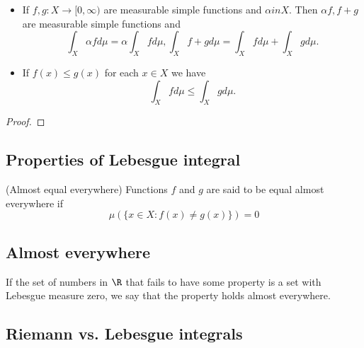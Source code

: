 \begin{refsection}
\begin{theorem}\cite[376]{johnsonbaugh2010foundations}\hfill
	\begin{itemize}
		\item If $f,g: X\to [0,\infty)$ are measurable simple functions and $\alpha in X$. Then $\alpha f, f+g$ are measurable simple functions and 
		$$\int_X \alpha f d\mu = \alpha \int_X f d\mu, \int_X  f+g d\mu = \int_X f d\mu + \int_X g d\mu.$$ 	
		\item If $f(x) \leq g(x)$ for each $x\in X$ we have $$\int_X fd\mu \leq \int_X g d\mu.$$
	\end{itemize}		
\end{theorem}
\begin{proof}
	
\end{proof}






\subsection{Properties of Lebesgue integral}
\begin{definition}
(Almost equal everywhere) Functions $f$ and $g$ are said to be equal almost everywhere if \cite{wiki:lebesgueintegral}
$$\mu(\{x\in X:f(x)\neq g(x)\}) = 0$$
\end{definition}

\begin{theorem}
	
	
\end{theorem}



\subsection{Almost everywhere}
\begin{definition}
If the set of numbers in $\R$ that fails to have some property is a set with Lebesgue measure zero, we say that the property holds almost everywhere. \cite{shreve2004stochastic2}
\end{definition}



\subsection{Riemann vs. Lebesgue integrals}


\end{refsection}
